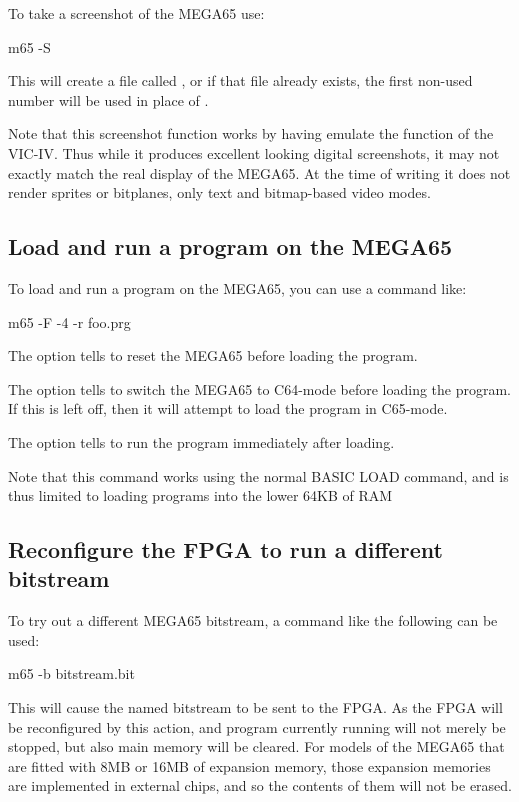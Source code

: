 To take a screenshot of the MEGA65 use:

\begin{screenoutput}
m65 -S
\end{screenoutput}

This will create a file called ,
or if that file already exists, the first non-used number will be used
in place of .

Note that this screenshot function works by having  emulate the
function of the VIC-IV. Thus while it produces excellent looking
digital screenshots, it may not exactly match the real display of the
MEGA65.  At the time of writing it does not render sprites or
bitplanes, only text and bitmap-based video modes.

\subsection{Load and run a program on the MEGA65}

To load and run a program on the MEGA65, you can use a command like:

\begin{screenoutput}
m65 -F -4 -r foo.prg
\end{screenoutput}

The  option tells  to reset the MEGA65
before loading the program.

The  option tells  to switch the MEGA65
to C64-mode before loading the program. If this is left off, then it
will attempt to load the program in C65-mode.

The  option tells  to run the program
immediately after loading.

Note that this command works using the normal BASIC LOAD command, and
is thus limited to loading programs into the lower 64KB of RAM

\subsection{Reconfigure the FPGA to run a different bitstream}

To try out a different MEGA65 bitstream, a command like the following can be
used:

\begin{screenoutput}
m65 -b bitstream.bit
\end{screenoutput}

This will cause the named bitstream to be sent to the FPGA.  As the
FPGA will be reconfigured by this action, and program currently
running will not merely be stopped, but also main memory will be
cleared. For models of the MEGA65 that are fitted with 8MB or 16MB of
expansion memory, those expansion memories are implemented in external
chips, and so the contents of them will not be erased.

